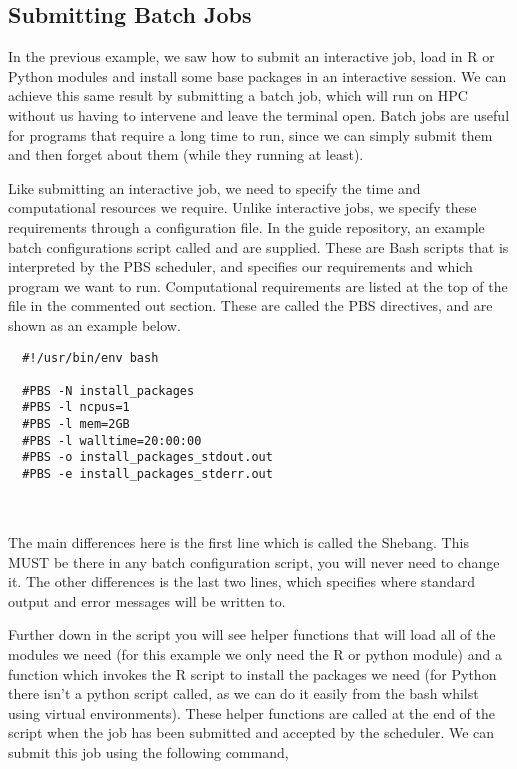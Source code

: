 \subsection{Submitting Batch Jobs}
\label{sec:batch}
In the previous example, we saw how to submit an interactive job, load in R or Python modules and install some base packages in an interactive session. We can achieve this same result by submitting a batch job, which will run on HPC without us having to intervene and leave the terminal open. Batch jobs are useful for programs that require a long time to run, since we can simply submit them and then forget about them (while they running at least).
%
%
\par
%
%
Like submitting an interactive job, we need to specify the time and computational resources we require. Unlike interactive jobs, we specify these requirements through a configuration file. In the guide repository, an example batch configurations script called  and  are supplied. These are Bash scripts that is interpreted by the PBS scheduler, and specifies our requirements and which program we want to run. Computational requirements are listed at the top of the file in the commented out section. These are called the PBS directives, and are shown as an example below.
%
%
\\
%
%
\par
\begin{verbatim}
  #!/usr/bin/env bash
  
  #PBS -N install_packages
  #PBS -l ncpus=1
  #PBS -l mem=2GB
  #PBS -l walltime=20:00:00
  #PBS -o install_packages_stdout.out
  #PBS -e install_packages_stderr.out
  
\end{verbatim}
%
\\
%
The main differences here is the first line which is called the Shebang. This MUST be there in any batch configuration script, you will never need to change it. The other differences is the last two lines, which specifies where standard output and error messages will be written to.
%
%
\par
%
%
Further down in the script you will see helper functions that will load all of the modules we need (for this example we only need the R or python module) and a function which invokes the R script to install the packages we need (for Python there isn't a python script called, as we can do it easily from the bash whilst using virtual environments). These helper functions are called at the end of the script when the job has been submitted and accepted by the scheduler. We can submit this job using the following command,
